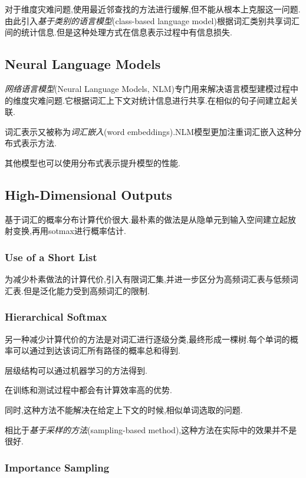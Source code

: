 对于维度灾难问题,使用最近邻查找的方法进行缓解,但不能从根本上克服这一问题.由此引入\textit{基于类别的语言模型}(class-based language model)根据词汇类别共享词汇间的统计信息.但是这种处理方式在信息表示过程中有信息损失.

\subsection{Neural Language Models}

\textit{网络语言模型}(Neural Language Models, NLM)专门用来解决语言模型建模过程中的维度灾难问题.它根据词汇上下文对统计信息进行共享.在相似的句子间建立起关联.

词汇表示又被称为\textit{词汇嵌入}(word embeddings).NLM模型更加注重词汇嵌入这种分布式表示方法.

其他模型也可以使用分布式表示提升模型的性能.

\subsection{High-Dimensional Outputs}

基于词汇的概率分布计算代价很大.最朴素的做法是从隐单元到输入空间建立起放射变换,再用sotmax进行概率估计.

\subsubsection{Use of a Short List}

为减少朴素做法的计算代价,引入有限词汇集,并进一步区分为高频词汇表与低频词汇表.但是泛化能力受到高频词汇的限制.

\subsubsection{Hierarchical Softmax}

另一种减少计算代价的方法是对词汇进行逐级分类,最终形成一棵树.每个单词的概率可以通过到达该词汇所有路径的概率总和得到.

层级结构可以通过机器学习的方法得到.

在训练和测试过程中都会有计算效率高的优势.

同时,这种方法不能解决在给定上下文的时候,相似单词选取的问题.

相比于\textit{基于采样的方法}(sampling-based method),这种方法在实际中的效果并不是很好.

\subsubsection{Importance Sampling}

